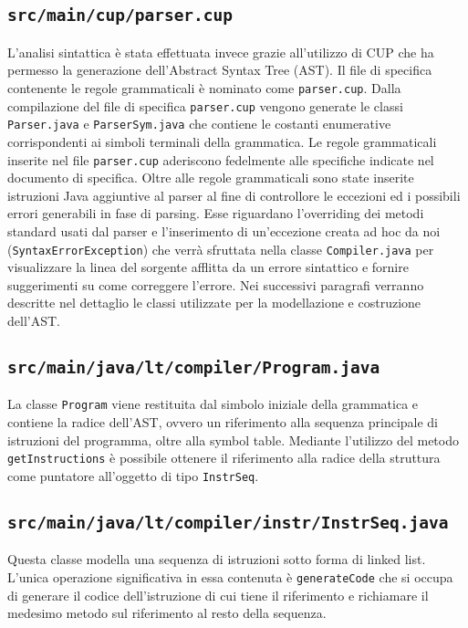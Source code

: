 \documentclass[10pt,a4paper]{article}
\begin{document}
\subsection{\texttt{src/main/cup/parser.cup}}
L'analisi sintattica è stata effettuata invece grazie all'utilizzo di CUP che ha permesso la generazione dell'Abstract Syntax Tree (AST). Il file di specifica contenente le regole grammaticali è nominato come \texttt{parser.cup}. Dalla compilazione del file di specifica \texttt{parser.cup} vengono generate le classi \texttt{Parser.java} e \texttt{ParserSym.java} che contiene le costanti enumerative corrispondenti ai simboli terminali della grammatica.
Le regole grammaticali inserite nel file \texttt{parser.cup} aderiscono fedelmente alle specifiche indicate nel documento di specifica. Oltre alle regole grammaticali sono state inserite istruzioni Java aggiuntive al parser al fine di controllore le eccezioni ed i possibili errori generabili in fase di parsing.
Esse riguardano l'overriding dei metodi standard usati dal parser e l'inserimento di un'eccezione creata ad hoc da noi (\texttt{SyntaxErrorException}) che verrà sfruttata nella classe \texttt{Compiler.java} per visualizzare la linea del sorgente afflitta da un errore sintattico e fornire suggerimenti su come correggere l'errore. Nei successivi paragrafi verranno descritte nel dettaglio le classi utilizzate per la modellazione e costruzione dell'AST.

\subsection{\texttt{src/main/java/lt/compiler/Program.java}}
La classe \texttt{Program} viene restituita dal simbolo iniziale della grammatica e contiene la radice dell'AST, ovvero un riferimento alla sequenza principale di istruzioni del programma, oltre alla symbol table. Mediante l'utilizzo del metodo \texttt{getInstructions} è possibile ottenere il riferimento alla radice della struttura come puntatore all'oggetto di tipo \texttt{InstrSeq}.

\subsection{\texttt{src/main/java/lt/compiler/instr/InstrSeq.java}}
Questa classe modella una sequenza di istruzioni sotto forma di linked list. L'unica operazione significativa in essa contenuta è \texttt{generateCode} che si occupa di generare il codice dell'istruzione di cui tiene il riferimento e richiamare il medesimo metodo sul riferimento al resto della sequenza.
\end{document}
